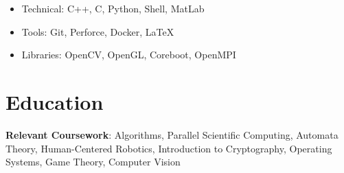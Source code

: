 \documentclass{Custom_CV}
\begin{document}
\begin{itemize}[noitemsep]
\item Technical: C++, C, Python, Shell, MatLab
\item Tools: Git, Perforce, Docker, \LaTeX
\item Libraries: OpenCV, OpenGL, Coreboot, OpenMPI
\end{itemize}

\section{Education}

\textbf{Relevant Coursework}:
Algorithms, Parallel Scientific Computing, Automata Theory, Human-Centered Robotics, Introduction to Cryptography, Operating Systems, Game Theory, Computer Vision








\end{document}
